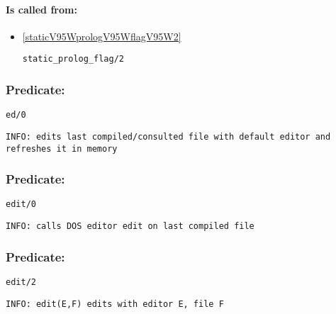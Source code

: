 \paragraph{Is called from:} 
\begin{itemize}
\item \ref{staticV95WprologV95WflagV95W2} 
\begin{verbatim}
static_prolog_flag/2
\end{verbatim}

\end{itemize}

\subsubsection{Predicate:} \label{edV95W0}

\begin{verbatim}
ed/0
\end{verbatim}

{\small \begin{verbatim}
INFO: edits last compiled/consulted file with default editor and refreshes it in memory

\end{verbatim}}

\subsubsection{Predicate:} \label{editV95W0}

\begin{verbatim}
edit/0
\end{verbatim}

{\small \begin{verbatim}
INFO: calls DOS editor edit on last compiled file

\end{verbatim}}

\subsubsection{Predicate:} \label{editV95W2}

\begin{verbatim}
edit/2
\end{verbatim}

{\small \begin{verbatim}
INFO: edit(E,F) edits with editor E, file F

\end{verbatim}}
